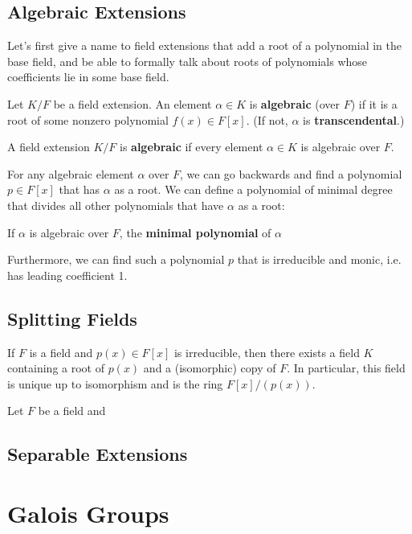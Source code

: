 \documentclass[12pt]{scrartcl}
\begin{document}
\subsection{Algebraic Extensions}
Let's first give a name to field extensions that add a root of a polynomial in the base field, and be able to formally talk about roots of polynomials whose coefficients lie in some base field. 
\begin{definition}
    Let $K/F$ be a field extension. An element $\alpha \in K$ is \textbf{algebraic} (over $F$) if it is a root of some nonzero polynomial $f(x) \in F[x]$. (If not, $\alpha$ is \textbf{transcendental}.)
\end{definition}
\begin{definition}
    A field extension $K/F$ is \textbf{algebraic} if every element $\alpha \in K$ is algebraic over $F$. 
\end{definition}
For any algebraic element $\alpha$ over $F$, we can go backwards and find a polynomial $p \in F[x]$ that has $\alpha$ as a root. We can define a polynomial of minimal degree that divides all other polynomials that have $\alpha$ as a root: 
\begin{definition}
    If $\alpha$ is algebraic over $F$, the \textbf{minimal polynomial} of $\alpha$ 
\end{definition}

Furthermore, we can find such a polynomial $p$ that is irreducible and monic, i.e. has leading coefficient 1. 


\subsection{Splitting Fields}

\begin{theorem}
    If $F$ is a field and $p(x) \in F[x]$ is irreducible, then there exists a field $K$ containing a root of $p(x)$ and a (isomorphic) copy of $F$. In particular, this field is unique up to isomorphism and is the ring $F[x]/(p(x))$. 
\end{theorem}
\begin{definition}
    Let $F$ be a field and 
\end{definition}

\subsection{Separable Extensions}


\section{Galois Groups}
\end{document}
